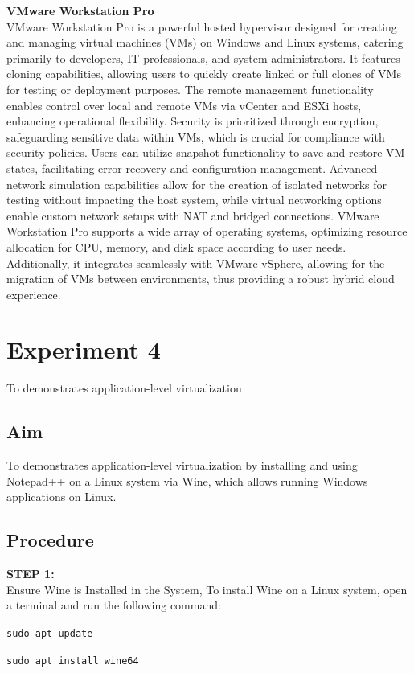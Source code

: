 \documentclass[12pt]{article}
\begin{document}
\begin{spacing}{1.5}
\begin{adjustwidth}{0cm}{0cm}
\begin{justify}
\textbf{VMware Workstation Pro} \\
VMware Workstation Pro is a powerful hosted hypervisor designed for creating and managing virtual machines (VMs) on Windows and Linux systems, catering primarily to developers, IT professionals, and system administrators. It features cloning capabilities, allowing users to quickly create linked or full clones of VMs for testing or deployment purposes. The remote management functionality enables control over local and remote VMs via vCenter and ESXi hosts, enhancing operational flexibility. Security is prioritized through encryption, safeguarding sensitive data within VMs, which is crucial for compliance with security policies. Users can utilize snapshot functionality to save and restore VM states, facilitating error recovery and configuration management. Advanced network simulation capabilities allow for the creation of isolated networks for testing without impacting the host system, while virtual networking options enable custom network setups with NAT and bridged connections. VMware Workstation Pro supports a wide array of operating systems, optimizing resource allocation for CPU, memory, and disk space according to user needs. Additionally, it integrates seamlessly with VMware vSphere, allowing for the migration of VMs between environments, thus providing a robust hybrid cloud experience.

\newpage

\section{Experiment 4}
To demonstrates application-level virtualization 
\subsection{Aim} 
To demonstrates application-level virtualization by installing and using
Notepad++ on a Linux system via Wine, which allows running Windows applications
on Linux.
\subsection{Procedure}

\textbf{STEP 1:} \\
Ensure Wine is Installed in the System, To install Wine on a Linux system, open a terminal and run the following command:



\begin{center}
\texttt{sudo apt update}
\end{center}
\begin{center}
\texttt{sudo apt install wine64}
\end{center}


\end{justify}
\end{adjustwidth}
\end{spacing}
\end{document}
